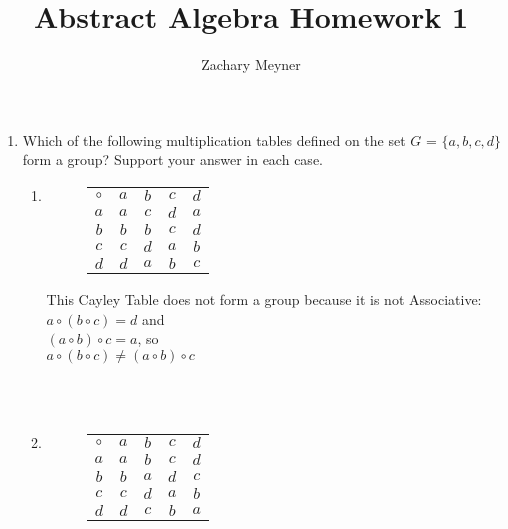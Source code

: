 \documentclass[12pt]{article}
\title{Abstract Algebra Homework 1}
\author{Zachary Meyner}
\date{}
\newlength{\strutheight}
\begin{document}
\setlength\extrarowheight{3pt}
\maketitle
\begin{enumerate}
    \item Which of the following multiplication tables defined on the set $G$ = $\{a,b,c,d\}$ form a
          group? Support your answer in each case. 
    \begin{enumerate}
        \item \begin{adjustbox}{valign=T,raise=\strutheight,minipage={1.0\linewidth}}
              \begin{wrapfigure}{l}{0pt}
              \begin{tabular}{c|cccc}
              $\circ$ & $a$ & $b$ & $c$ & $d$ \\
              \cline{1-5}
              $a$       & $a$ & $c$ & $d$ & $a$ \\
              $b$       & $b$ & $b$ & $c$ & $d$ \\
              $c$       & $c$ & $d$ & $a$ & $b$ \\
              $d$       & $d$ & $a$ & $b$ & $c$ \\

            \end{tabular}
            \end{wrapfigure}
            This Cayley Table does not form a group because it is not Associative: \\
            $a \circ (b \circ c) = d$ and \\
            $(a\circ b) \circ c = a$,  so \\
            $a \circ (b \circ c) \neq (a \circ b) \circ c$
            \end{adjustbox}
            \\ \\ 
        \item \begin{adjustbox}{valign=T,raise=\strutheight,minipage={1.0\linewidth}}
              \begin{wrapfigure}{l}{0pt}
              \begin{tabular}{c|cccc}
              $\circ$ & $a$ & $b$ & $c$ & $d$ \\
              \cline{1-5}
              $a$       & $a$ & $b$ & $c$ & $d$ \\
              $b$       & $b$ & $a$ & $d$ & $c$ \\
              $c$       & $c$ & $d$ & $a$ & $b$ \\
              $d$       & $d$ & $c$ & $b$ & $a$ \\


\end{tabular}
\end{wrapfigure}
\end{adjustbox}
\end{enumerate}
\end{enumerate}
\end{document}
